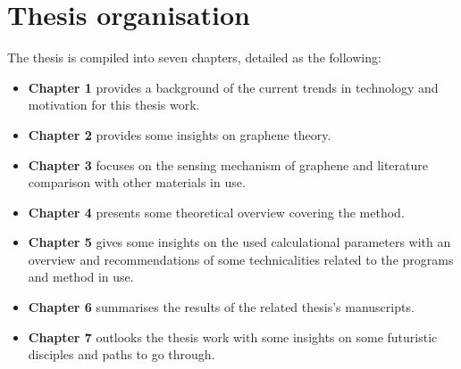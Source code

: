\section{Thesis organisation}
The thesis is compiled into seven chapters, detailed as the following:
\begin{itemize}
\item \textbf{Chapter 1} provides a background of the current trends in technology and motivation for this thesis work.
\item \textbf{Chapter 2} provides some insights on graphene theory.
\item \textbf{Chapter 3} focuses on the sensing mechanism of graphene and literature comparison with other materials in use.
\item \textbf{Chapter 4} presents some theoretical overview covering the method.
\item \textbf{Chapter 5} gives some insights on the used calculational parameters with an overview and recommendations of some technicalities related to the programs and method in use.
\item \textbf{Chapter 6} summarises the results of the related thesis's manuscripts.
\item \textbf{Chapter 7} outlooks the thesis work with some insights on some futuristic disciples and paths to go through.
\end{itemize}
\endinput
